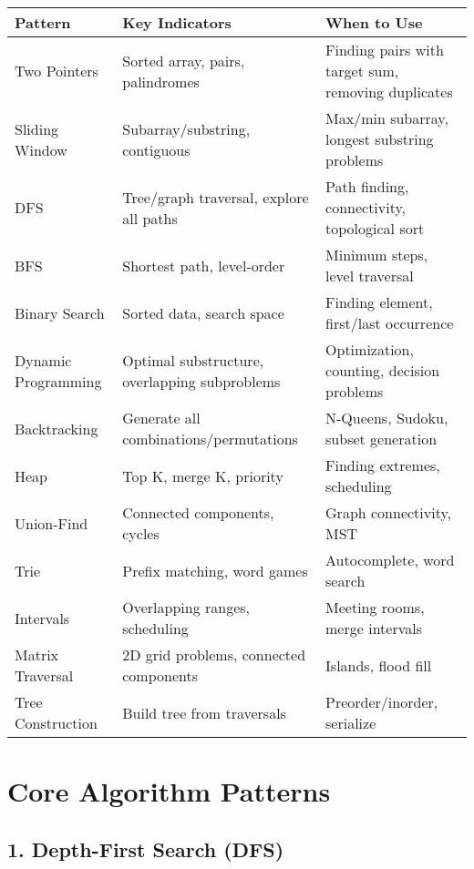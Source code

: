 \documentclass[10pt,a4paper]{article}
\begin{document}
\begin{table}[h]
\centering
\begin{tabular}{|p{3cm}|p{4cm}|p{7cm}|}
\hline
\textbf{Pattern} & \textbf{Key Indicators} & \textbf{When to Use} \\
\hline
Two Pointers & Sorted array, pairs, palindromes & Finding pairs with target sum, removing duplicates \\
\hline
Sliding Window & Subarray/substring, contiguous & Max/min subarray, longest substring problems \\
\hline
DFS & Tree/graph traversal, explore all paths & Path finding, connectivity, topological sort \\
\hline
BFS & Shortest path, level-order & Minimum steps, level traversal \\
\hline
Binary Search & Sorted data, search space & Finding element, first/last occurrence \\
\hline
Dynamic Programming & Optimal substructure, overlapping subproblems & Optimization, counting, decision problems \\
\hline
Backtracking & Generate all combinations/permutations & N-Queens, Sudoku, subset generation \\
\hline
Heap & Top K, merge K, priority & Finding extremes, scheduling \\
\hline
Union-Find & Connected components, cycles & Graph connectivity, MST \\
\hline
Trie & Prefix matching, word games & Autocomplete, word search \\
\hline
Intervals & Overlapping ranges, scheduling & Meeting rooms, merge intervals \\
\hline
Matrix Traversal & 2D grid problems, connected components & Islands, flood fill \\
\hline
Tree Construction & Build tree from traversals & Preorder/inorder, serialize \\
\hline
\end{tabular}
\end{table}

\section{Core Algorithm Patterns}

\subsection{1. Depth-First Search (DFS)}
\end{document}
